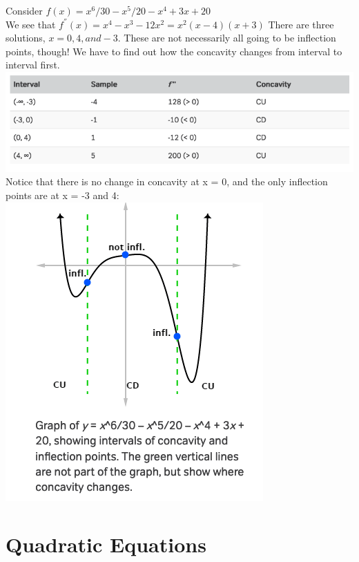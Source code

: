 \documentclass{book}
\begin{document}
	
	Consider $f(x) = x^6/30 - x^5/20 - x^4 + 3x + 20$ \\
	We see that $f^{''}(x) = x^4 - x^3-12x^2 = x^2(x-4)(x+3)$
	There are three solutions, $x = 0, 4, and -3$. These are not necessarily all going to be inflection points, though! We have to find out how the concavity changes from interval to interval first. \\
	
	\includegraphics[scale=0.5]{concavex1} \\
	
	Notice that there is no change in concavity at x = 0, and the only inflection points are at x = -3 and 4: \\
	
	\includegraphics[scale=0.5]{concaveex2}
	
	
	\chapter{Quadratic Equations}
	
\end{document}
